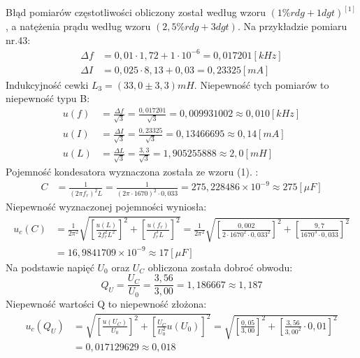 \documentclass[polish, 11pt, a4paper]{article}
\begin{document}
		Błąd pomiarów częstotliwości obliczony został według wzoru \((1\%rdg+1 dgt)^{[1]}\), a natężenia prądu według wzoru \((2,5\%rdg+3dgt)\). Na przykładzie pomiaru nr.43:
		\begin{align*}
			\Delta f &= 0,01\cdot 1,72 + 1\cdot 10^{-6} = 0,017201 [kHz]\\
			\Delta I &= 0,025\cdot 8,13 + 0,03 = 0,23325 [mA]			
		\end{align*}
		Indukcyjność cewki \(L_3=(33,0\pm 3,3)mH\).
		Niepewność tych pomiarów to niepewność typu B:
		\begin{align*}
			u(f)&=\frac{\Delta f}{\sqrt{3}} = \frac{0,017201}{\sqrt{3}} = 0,009931002 \approx 0,010 [kHz]\\[6pt]
			u(I)&=\frac{\Delta I}{\sqrt{3}} = \frac{0,23325}{\sqrt{3}} = 0,13466695 \approx 0,14 [mA]\\[6pt]
			u(L)&=\frac{\Delta L}{\sqrt{3}} = \frac{3,3}{\sqrt{3}} = 1,905255888 \approx 2,0 [mH]			
		\end{align*}
		Pojemność kondesatora wyznaczona została ze wzoru (1). :
		\begin{align*}
			C	&=	\frac{1}{(2\pi f_r)^2L} = \frac{1}{(2\pi \cdot 1670)^2 \cdot 0,033} = 275,228486\times 10^{-9}  \approx 275 [\mu F]		
		\end{align*}
		Niepewność wyznaczonej pojemności wyniosła:
		\begin{align*}
			u_c(C)	&=	\frac{1}{2\pi^2}\sqrt{\left[ \frac{u(L)}{2 f_r^2 L^2}\right]^2 + \left[ \frac{u(f_r)}{f_r^3 L}\right]^2}
					=	\frac{1}{2\pi^2}\sqrt{\left[ \frac{0,002}{2\cdot 1670^2\cdot 0,033^2}\right]^2 + \left[ \frac{9,7}{1670^3\cdot 0,033}\right]^2}\\[6pt]
					&=	16,9841709\times 10^{-9} \approx 17 [\mu F]					
		\end{align*}
		Na podstawie napięć \(U_0\) oraz \(U_C\) obliczona została dobroć obwodu:
		\begin{displaymath}
			Q_U = \frac{U_C}{U_0} = \frac{3,56}{3,00} = 1,186667 \approx 1,187			
		\end{displaymath}
		Niepewność wartości Q to niepewność złożona:
		\begin{align*}
			u_c(Q_U)	&=	\sqrt{\left[ \frac{u(U_C)}{U_0}\right]^2 + \left[ \frac{U_C}{U_0^2} u(U_0)\right]^2}
					=	\sqrt{\left[ \frac{0,05}{3,00}\right]^2 + \left[ \frac{3,56}{3,00^2}\cdot 0,01\right]^2}\\[6pt]
					&=	0,017129629	\approx 0,018				
		\end{align*}
\end{document}

